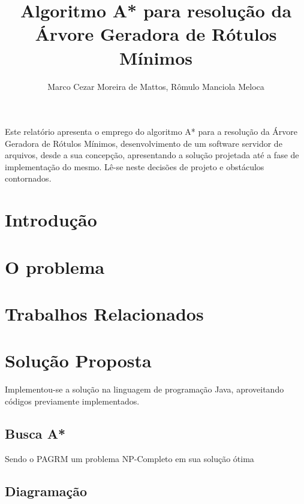 \documentclass[12pt]{article}
\title{Algoritmo A* para resolução da Árvore Geradora de Rótulos Mínimos}
\author{Marco Cezar Moreira de Mattos\inst{1}, Rômulo Manciola Meloca\inst{1}}
\begin{document}
\maketitle
     
\begin{resumo} 
  Este relatório apresenta o emprego do algoritmo A* para a resolução da Árvore Geradora de Rótulos Mínimos, desenvolvimento de um software servidor de arquivos, desde a sua concepção, apresentando a solução projetada até a fase de implementação do mesmo. Lê-se neste decisões de projeto e obstáculos contornados.
\end{resumo}

\section{Introdução}\label{sec:introducao}

\section{O problema}\label{sec:problema}

\section{Trabalhos Relacionados}\label{sec:trabalhosRelacionados}

\section{Solução Proposta}\label{sec:solucao}

	Implementou-se a solução na linguagem de programação Java, aproveitando códigos previamente implementados.

\subsection{Busca A*}\label{sec:aestrela}

	Sendo o PAGRM um problema NP-Completo em sua solução ótima 

\subsection{Diagramação}\label{sec:diagramacao}
\end{document}
